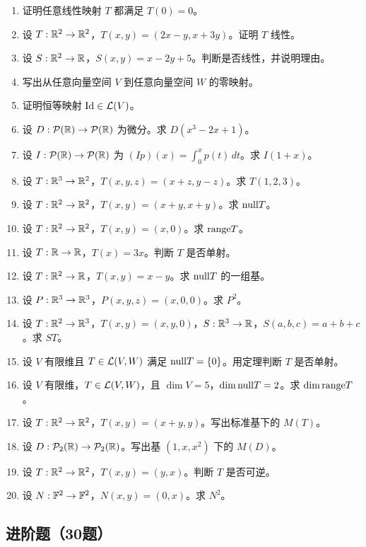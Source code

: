\begin{enumerate}[label=\basic\ \arabic*., leftmargin=*] \item 证明任意线性映射 $T$ 都满足
$T(0)=0$。 \item 设 $T:\mathbb{R}^2\to\mathbb{R}^2$，$T(x,y)=(2x-y,x+3y)$。证明 $T$ 线性。 \item 设
$S:\mathbb{R}^2\to\mathbb{R}$，$S(x,y)=x-2y+5$。判断是否线性，并说明理由。 \item 写出从任意向量空间 $V$ 到任意向量空间 $W$ 的零映射。 \item
证明恒等映射 $\mathrm{Id}\in\mathcal{L}(V)$。 \item 设 $D:\mathcal{P}(\mathbb{R})\to\mathcal{P}(\mathbb{R})$ 为微分。求 $D(x^3-2x+1)$。 \item 设
$I:\mathcal{P}(\mathbb{R})\to\mathcal{P}(\mathbb{R})$ 为 $(Ip)(x)=\int_0^x p(t)\,dt$。求 $I(1+x)$。 \item 设
$T:\mathbb{R}^3\to\mathbb{R}^2$，$T(x,y,z)=(x+z,y-z)$。求 $T(1,2,3)$。 \item 设
$T:\mathbb{R}^2\to\mathbb{R}^2$，$T(x,y)=(x+y,x+y)$。求 $\mathrm{null} T$。 \item 设 $T:\mathbb{R}^2\to\mathbb{R}^2$，$T(x,y)=(x,0)$。求
$\mathrm{range} T$。 \item 设 $T:\mathbb{R}\to\mathbb{R}$，$T(x)=3x$。判断 $T$ 是否单射。 \item 设
$T:\mathbb{R}^2\to\mathbb{R}$，$T(x,y)=x-y$。求 $\mathrm{null} T$ 的一组基。 \item 设 $P:\mathbb{R}^3\to\mathbb{R}^3$，$P(x,y,z)=(x,0,0)$。求
$P^2$。 \item 设 $T:\mathbb{R}^2\to\mathbb{R}^3$，$T(x,y)=(x,y,0)$，$S:\mathbb{R}^3\to\mathbb{R}$，$S(a,b,c)=a+b+c$。求 $ST$。
\item 设 $V$ 有限维且 $T\in\mathcal{L}(V,W)$ 满足 $\mathrm{null} T=\{0\}$。用定理判断 $T$ 是否单射。 \item 设 $V$
有限维，$T\in\mathcal{L}(V,W)$，且 $\dim V=5$，$\dim \mathrm{null} T=2$。求 $\dim \mathrm{range} T$。 \item 设
$T:\mathbb{R}^2\to\mathbb{R}^2$，$T(x,y)=(x+y,y)$。写出标准基下的 $M(T)$。 \item 设
$D:\mathcal{P}_2(\mathbb{R})\to\mathcal{P}_2(\mathbb{R})$。写出基 $(1,x,x^2)$ 下的 $M(D)$。 \item 设
$T:\mathbb{R}^2\to\mathbb{R}^2$，$T(x,y)=(y,x)$。判断 $T$ 是否可逆。 \item 设 $N:\mathbb{F}^2\to\mathbb{F}^2$，$N(x,y)=(0,x)$。求
$N^2$。 \end{enumerate}

\subsection*{进阶题（30题）}

